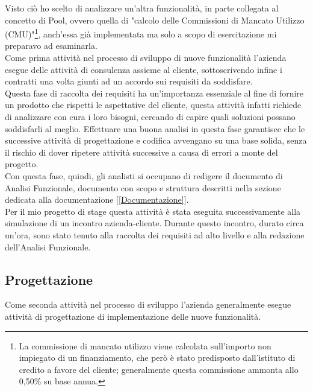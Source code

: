 Visto ciò ho scelto di analizzare un'altra funzionalità, in parte collegata al concetto di Pool, ovvero quella di "calcolo delle Commissioni di Mancato Utilizzo (CMU)"\footnote{La commissione di mancato utilizzo viene calcolata sull'importo non impiegato di un finanziamento, che però è stato predisposto dall'istituto di credito a favore del cliente; generalmente questa commissione ammonta allo 0,50\% su base annua.}, anch'essa già implementata ma solo a scopo di esercitazione mi preparavo ad esaminarla.\\

	Come prima attività nel processo di sviluppo di nuove funzionalità l'azienda esegue delle attività di consulenza assieme al cliente, sottoscrivendo infine i contratti una volta giunti ad un accordo sui requisiti da soddisfare.\\
	
	Questa fase di raccolta dei requisiti ha un'importanza essenziale al fine di fornire un prodotto che rispetti le aspettative del cliente, questa attività infatti richiede di analizzare con cura i loro bisogni, cercando di capire quali soluzioni possano soddisfarli al meglio. Effettuare una buona analisi in questa fase garantisce che le successive attività di progettazione e codifica avvengano su una base solida, senza il rischio di dover ripetere attività successive a causa di errori a monte del progetto.\\
	
	Con questa fase, quindi, gli analisti si occupano di redigere il documento di Analisi Funzionale, documento con scopo e struttura descritti nella sezione dedicata alla documentazione [\ref{Documentazione}].\\

	Per il mio progetto di stage questa attività è stata eseguita successivamente alla simulazione di un incontro azienda-cliente. Durante questo incontro, durato circa un'ora, sono stato tenuto alla raccolta dei requisiti ad alto livello e alla redazione dell'Analisi Funzionale.	

\subsection{Progettazione}

	Come seconda attività nel processo di sviluppo l'azienda generalmente esegue attività di progettazione di implementazione delle nuove funzionalità.\\

